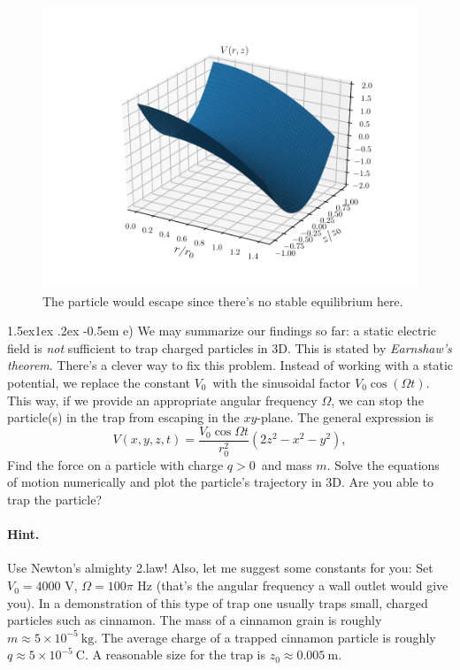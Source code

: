 \documentclass[%
oneside,                 %
final,                   %
10pt]{article}
\makeatletter
\newenvironment{doconceexercise}{}{}
\newcommand\subex{\@startsection{paragraph}{4}{\z@}%
                  {1.5ex\@plus1ex \@minus.2ex}%
                  {-0.5em}%
                  {\normalfont\normalsize\bfseries}}
\makeatother
\begin{document}
\begin{doconceexercise}
\begin{figure}[!ht]  %
  \centerline{\includegraphics[width=0.8\linewidth]{figures/fig-failed_trap.pdf}}
  \caption{
  The particle would escape since there's no stable equilibrium here. \label{fig:potential}
  }
\end{figure}



\subex{e)}
We may summarize our findings so far: a static electric field is \emph{not} sufficient to trap charged particles in 3D. This is stated by \emph{Earnshaw's theorem}. There's a clever way to fix this problem. Instead of working with a static potential, we replace the constant $V_0$ with the sinusoidal factor $V_0 \cos (\Omega t)$. This way, if we provide an appropriate angular frequency $\Omega$, we can stop the particle(s) in the trap from escaping in the $xy$-plane. The general expression is
\begin{equation}
  V(x,y,z,t) = \frac{V_0\cos \Omega t}{r_0^2}(2z^2 - x^2 - y^2),
\end{equation}
Find the force on a particle with charge $q > 0$ and mass $m$. Solve the equations of motion numerically and plot the particle's trajectory in 3D. Are you able to trap the particle?


\paragraph{Hint.}
Use Newton's almighty 2.law! Also, let me suggest some constants for you: Set  $V_0 = 4000$ V, $\Omega = 100\pi$ Hz (that's the angular frequency a wall outlet would give you). In a demonstration of this type of trap one usually traps small, charged particles such as cinnamon. The mass of a cinnamon grain is roughly $m \approx 5\times 10^{-5} \ \text{kg}$. The average charge of a trapped cinnamon particle is roughly $q \approx 5\times 10^{-5} \ \text{C}$. A reasonable size for the trap is $z_0 \approx 0.005 \ \text{m}$.


\end{doconceexercise}
\end{document}
